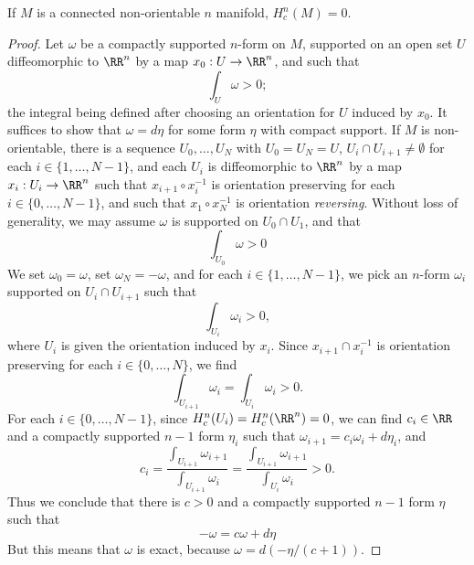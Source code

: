\begin{theorem}
    If $M$ is a connected non-orientable $n$ manifold, $H^n_c(M) = 0$.
\end{theorem}
\begin{proof}
    Let $\omega$ be a compactly supported $n$-form on $M$, supported on an open set $U$ diffeomorphic to $\RR^n$ by a map $x_0: U \to \RR^n$, and such that
    \[ \int_U \omega > 0; \]
    the integral being defined after choosing an orientation for $U$ induced by $x_0$. It suffices to show that $\omega = d\eta$ for some form $\eta$ with compact support. If $M$ is non-orientable, there is a sequence $U_0, \dots, U_N$ with $U_0 = U_N = U$, $U_i \cap U_{i+1} \neq \emptyset$ for each $i \in \{ 1, \dots, N-1 \}$, and each $U_i$ is diffeomorphic to $\RR^n$ by a map $x_i: U_i \to \RR^n$ such that $x_{i+1} \circ x_i^{-1}$ is orientation preserving for each $i \in \{ 0, \dots, N-1 \}$, and such that $x_1 \circ x_N^{-1}$ is orientation \emph{reversing}. Without loss of generality, we may assume $\omega$ is supported on $U_0 \cap U_1$, and that
    \[ \int_{U_0} \omega > 0 \]
    We set $\omega_0 = \omega$, set $\omega_N = -\omega$, and for each $i \in \{ 1, \dots, N-1 \}$, we pick an $n$-form $\omega_i$ supported on $U_i \cap U_{i+1}$ such that
    \[ \int_{U_i} \omega_i > 0, \]
    where $U_i$ is given the orientation induced by $x_i$. Since $x_{i+1} \cap x_i^{-1}$ is orientation preserving for each $i \in \{ 0, \dots, N \}$, we find
    \[ \int_{U_{i+1}} \omega_i = \int_{U_i} \omega_i > 0. \]
    For each $i \in \{ 0, \dots, N-1 \}$, since $H^n_c(U_i) = H^n_c(\RR^n) = 0$, we can find $c_i \in \RR$ and a compactly supported $n-1$ form $\eta_i$ such that $\omega_{i+1} = c_i \omega_i + d\eta_i$, and
    \[ c_i = \frac{\int_{U_{i+1}} \omega_{i+1}}{\int_{U_{i+1}} \omega_i} = \frac{\int_{U_{i+1}} \omega_{i+1}}{\int_{U_i} \omega_i} > 0. \]
    Thus we conclude that there is $c > 0$ and a compactly supported $n-1$ form $\eta$ such that
    \[ -\omega = c\omega + d\eta \]
    But this means that $\omega$ is exact, because $\omega = d(-\eta/(c + 1))$.
\end{proof}

